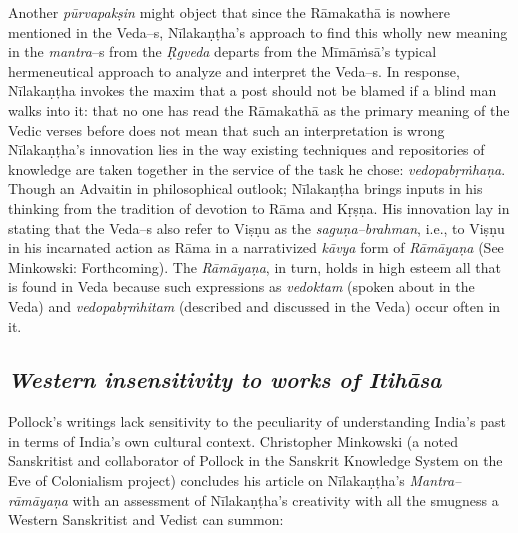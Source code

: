 Another \textit{pūrvapakṣin} might object that since the Rāmakathā is nowhere mentioned in the Veda–s, Nīlakaṇṭha’s approach to find this wholly new meaning in the \textit{mantra}–s from the \textit{Ṛgveda} departs from the Mīmāṁsā’s typical hermeneutical approach to analyze and interpret the Veda–s. In response, Nīlakaṇṭha invokes the maxim that a post should not be blamed if a blind man walks into it: that no one has read the Rāmakathā as the primary meaning of the Vedic verses before does not mean that such an interpretation is wrong Nīlakaṇṭha's innovation lies in the way existing techniques and repositories of knowledge are taken together in the service of the task he chose: \textit{vedopabṛṁhaṇa}. Though an Advaitin in philosophical outlook; Nīlakaṇṭha brings inputs in his thinking from the tradition of devotion to Rāma and Kṛṣṇa. His innovation lay in stating that the Veda–s also refer to Viṣṇu as the \textit{saguṇa–brahman}, i.e., to Viṣṇu in his incarnated action as Rāma in a narrativized \textit{kāvya} form of \textit{Rāmāyaṇa} (See Minkowski: Forthcoming). The \textit{Rāmāyaṇa}, in turn, holds in high esteem all that is found in Veda because such expressions as \textit{vedoktam} (spoken about in the Veda) and \textit{vedopabṛṁhitam} (described and discussed in the Veda) occur often in it.


\subsection*{\textit{Western insensitivity to works of Itihāsa}}

Pollock’s writings lack sensitivity to the peculiarity of understanding India’s past in terms of India’s own cultural context. Christopher Minkowski (a noted Sanskritist and collaborator of Pollock in the Sanskrit Knowledge System on the Eve of Colonialism project) concludes his article on Nīlakaṇṭha’s \textit{Mantra–rāmāyaṇa} with an assessment of Nīlakaṇṭha’s creativity with all the smugness a Western Sanskritist and Vedist can summon:

